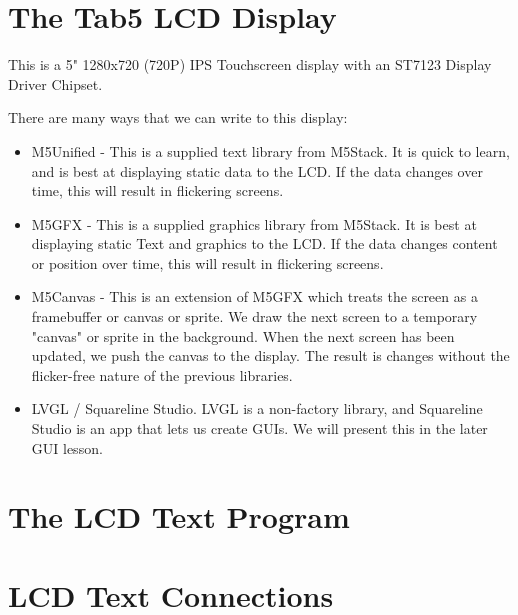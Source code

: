 \documentclass{article}
\begin{document}
\section*{The Tab5 LCD Display}

This is a 5" 1280x720 (720P) IPS Touchscreen display with an ST7123 Display 
Driver Chipset.

There are many ways that we can write to this display:
\begin{itemize}
  \item M5Unified - This is a supplied text library from M5Stack.  It is quick
  to learn, and is best at displaying static data to the LCD.  If the data 
  changes over time, this will result in flickering screens.
  \item M5GFX - This is a supplied graphics library from M5Stack.  It is best 
  at displaying static Text and graphics to the LCD.  If the data changes 
  content or position over time, this will result in flickering screens.
  \item M5Canvas - This is an extension of M5GFX which treats 
  the screen as a framebuffer or canvas or sprite.  We draw the next screen to 
  a temporary "canvas" or sprite in the background.  When the next screen has 
  been updated, we push the canvas to the display.  The result is changes
  without the flicker-free nature of the previous libraries.
  \item LVGL / Squareline Studio.  LVGL is a non-factory library, and 
  Squareline Studio is an app that lets us create GUIs.  We will present this 
  in the later GUI lesson.

\end{itemize}
\vspace{3mm}

\section*{The LCD Text Program}
\vspace{3mm}

\section*{LCD Text Connections}

\vspace{3mm}
\end{document}
